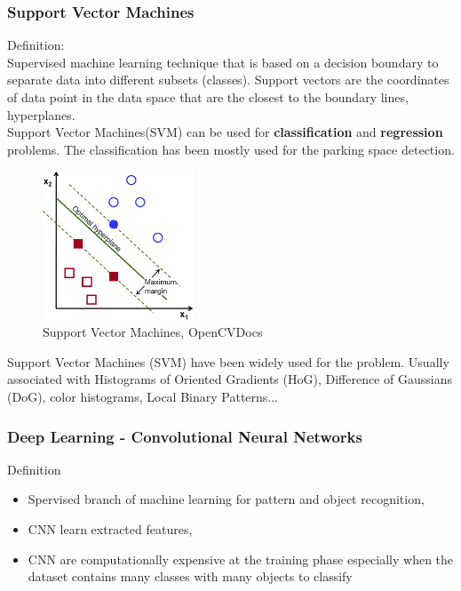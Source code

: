 \documentclass{beamer}
\begin{document}
\begin{frame}[allowframebreaks]
\frametitle{Support Vector Machines}
Definition:\\
Supervised machine learning technique that is based on a decision boundary to separate data into different subsets (classes). Support vectors are the coordinates of data point in the data space that are the closest to the boundary lines, hyperplanes.\\
Support Vector Machines(SVM) can be used for \textbf{classification} and \textbf{regression} problems. The classification has been mostly used for the parking space detection.

\begin{figure}[h!]
	\centering
	\includegraphics[width=0.4\textwidth]{Pictures/SVM}
	\caption{Support Vector Machines, OpenCVDocs}
\end{figure}

Support Vector Machines (SVM) have been widely used for the problem. Usually associated with Histograms of Oriented Gradients (HoG), Difference of Gaussians (DoG), color histograms, Local Binary Patterns...

\end{frame}

\begin{frame}
\frametitle{Deep Learning - Convolutional Neural Networks }

\begin{block}{Definition}

\begin{itemize}
\item Spervised branch of machine learning for pattern and object recognition,
\item CNN learn extracted features,
\item CNN are computationally expensive at the training phase especially when the dataset contains many classes with many objects to classify
\end{itemize}

\end{block}
\end{frame}
\end{document}
